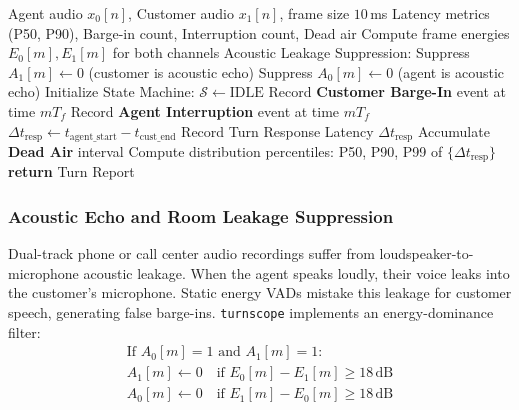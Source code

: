 \documentclass[10pt,journal,compsoc]{IEEEtran}
\begin{document}
\begin{algorithm}[t]
\caption{\texttt{turnscope}: Dual-Track Turn-Taking State Machine}
\label{alg:turnscope}
\begin{algorithmic}[1]
\REQUIRE Agent audio $x_0[n]$, Customer audio $x_1[n]$, frame size $10$\,ms
\ENSURE Latency metrics (P50, P90), Barge-in count, Interruption count, Dead air
\STATE Compute frame energies $E_0[m], E_1[m]$ for both channels
\STATE Acoustic Leakage Suppression:
        \STATE Suppress $A_1[m] \leftarrow 0$ (customer is acoustic echo)
        \STATE Suppress $A_0[m] \leftarrow 0$ (agent is acoustic echo)
    \ENDIF
\ENDIF
\STATE Initialize State Machine: $\mathcal{S} \leftarrow \text{IDLE}$
        \STATE Record \textbf{Customer Barge-In} event at time $m T_f$
        \STATE Record \textbf{Agent Interruption} event at time $m T_f$
        \STATE $\Delta t_{\text{resp}} \leftarrow t_{\text{agent\_start}} - t_{\text{cust\_end}}$
        \STATE Record Turn Response Latency $\Delta t_{\text{resp}}$
        \STATE Accumulate \textbf{Dead Air} interval
    \ENDIF
\ENDFOR
\STATE Compute distribution percentiles: P50, P90, P99 of $\{\Delta t_{\text{resp}}\}$
\STATE \textbf{return} Turn Report
\end{algorithmic}
\end{algorithm}

\subsubsection{Acoustic Echo and Room Leakage Suppression}
Dual-track phone or call center audio recordings suffer from loudspeaker-to-microphone acoustic leakage. When the agent speaks loudly, their voice leaks into the customer's microphone. Static energy VADs mistake this leakage for customer speech, generating false barge-ins. \texttt{turnscope} implements an energy-dominance filter:
\begin{align}
\text{If } A_0[m] = 1 \text{ and } A_1[m] = 1: \nonumber \\
A_1[m] \leftarrow 0 \quad \text{if } E_0[m] - E_1[m] \ge 18\,\text{dB} \\
A_0[m] \leftarrow 0 \quad \text{if } E_1[m] - E_0[m] \ge 18\,\text{dB}
\label{eq:dominance}
\end{align}
\end{document}
